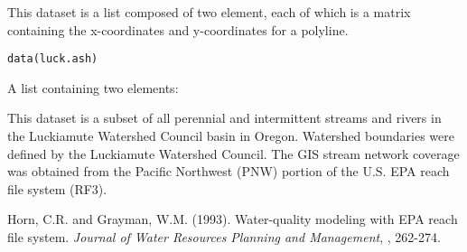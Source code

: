 \begin{Description}\relax
This dataset is a list composed of two element, each of which is a matrix
containing the x-coordinates and y-coordinates for a polyline.
\end{Description}
\begin{Usage}
\begin{verbatim}data(luck.ash)\end{verbatim}
\end{Usage}
\begin{Format}\relax
A list containing two elements:
\end{Format}
\begin{Source}\relax
This dataset is a subset of all perennial and intermittent streams and rivers in 
the Luckiamute Watershed Council basin in Oregon.  Watershed boundaries were 
defined by the Luckiamute Watershed Council.  The GIS stream network coverage 
was obtained from the Pacific Northwest (PNW) portion of  the U.S. EPA reach 
file system (RF3).
\end{Source}
\begin{References}\relax
Horn, C.R. and Grayman, W.M. (1993). Water-quality modeling with EPA reach file 
system.  \emph{Journal of Water Resources Planning and Management}, , 262-274.
\end{References}
